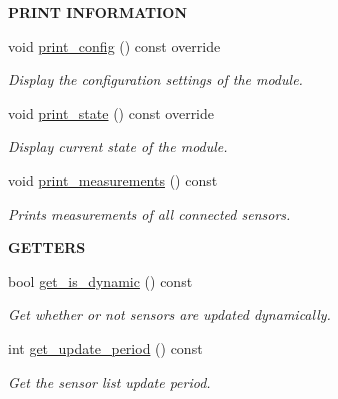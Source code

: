 \begin{Indent}{\bf P\+R\+I\+NT I\+N\+F\+O\+R\+M\+A\+T\+I\+ON}\par
\begin{DoxyCompactItemize}
\item 
void \hyperlink{class_loom___multiplexer_a21759070f77ec1560e9b2a272a0c0640}{print\+\_\+config} () const override
\begin{DoxyCompactList}\small\item\em Display the configuration settings of the module. \end{DoxyCompactList}\item 
void \hyperlink{class_loom___multiplexer_a2a60ebefe68aa75a3141015d2aa81955}{print\+\_\+state} () const override
\begin{DoxyCompactList}\small\item\em Display current state of the module. \end{DoxyCompactList}\item 
void \hyperlink{class_loom___multiplexer_aa77642642bfd9f33769f6fd98863e5cc}{print\+\_\+measurements} () const 
\begin{DoxyCompactList}\small\item\em Prints measurements of all connected sensors. \end{DoxyCompactList}\end{DoxyCompactItemize}
\end{Indent}
\begin{Indent}{\bf G\+E\+T\+T\+E\+RS}\par
\begin{DoxyCompactItemize}
\item 
bool \hyperlink{class_loom___multiplexer_a49c25a8c55ca026c231d59608fc0d6d4}{get\+\_\+is\+\_\+dynamic} () const 
\begin{DoxyCompactList}\small\item\em Get whether or not sensors are updated dynamically. \end{DoxyCompactList}\item 
int \hyperlink{class_loom___multiplexer_a40688a6e7c1ad60472d6ce148245ac13}{get\+\_\+update\+\_\+period} () const 
\begin{DoxyCompactList}\small\item\em Get the sensor list update period. \end{DoxyCompactList}\end{DoxyCompactItemize}
\end{Indent}
